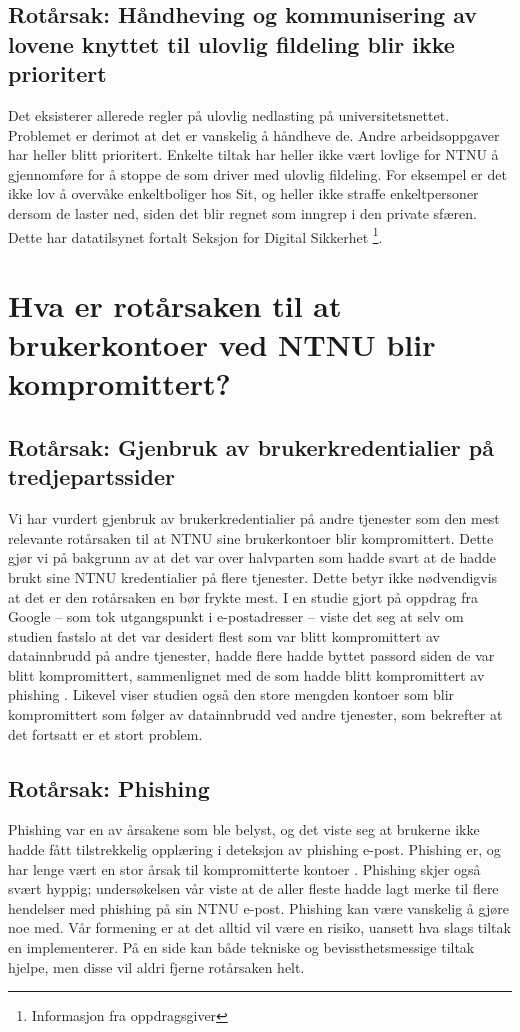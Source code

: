 \subsection*{Rotårsak: Håndheving og kommunisering av lovene knyttet til ulovlig fildeling blir ikke prioritert}
Det eksisterer allerede regler på ulovlig nedlasting på universitetsnettet. Problemet er derimot at det er vanskelig å håndheve de. Andre arbeidsoppgaver har heller blitt prioritert. Enkelte tiltak har heller ikke vært lovlige for NTNU å gjennomføre for å stoppe de som driver med ulovlig fildeling. For eksempel er det ikke lov å overvåke enkeltboliger hos Sit, og heller ikke straffe enkeltpersoner dersom de laster ned, siden det blir regnet som inngrep i den private sfæren. Dette har datatilsynet fortalt Seksjon for Digital Sikkerhet \footnote{Informasjon fra oppdragsgiver}. 


\section{Hva er rotårsaken til at brukerkontoer ved NTNU blir kompromittert?}

\subsection*{Rotårsak: Gjenbruk av brukerkredentialier på tredjepartssider}
Vi har vurdert gjenbruk av brukerkredentialier på andre tjenester som den mest relevante rotårsaken til at NTNU sine brukerkontoer blir kompromittert. Dette gjør vi på bakgrunn av at det var over halvparten som hadde svart at de hadde brukt sine NTNU kredentialier på flere tjenester. Dette betyr ikke nødvendigvis at det er den rotårsaken en bør frykte mest. I en studie gjort på oppdrag fra Google – som tok utgangspunkt i e-postadresser – viste det seg at selv om studien fastslo at det var desidert flest som var blitt kompromittert av datainnbrudd på andre tjenester, hadde flere hadde byttet passord siden de var blitt kompromittert, sammenlignet med de som hadde blitt kompromittert av phishing \cite{46437}. Likevel viser studien også den store mengden kontoer som blir kompromittert som følger av datainnbrudd ved andre tjenester, som bekrefter at det fortsatt er et stort problem. 

\subsection*{Rotårsak: Phishing}
Phishing var en av årsakene som ble belyst, og det viste seg at brukerne ikke hadde fått tilstrekkelig opplæring i deteksjon av phishing e-post. Phishing er, og har lenge vært en stor årsak til kompromitterte kontoer \cite{SophPhish}. Phishing skjer også svært hyppig; undersøkelsen vår viste at de aller fleste hadde lagt merke til flere hendelser med phishing på sin NTNU e-post. Phishing kan være vanskelig å gjøre noe med. Vår formening er at det alltid vil være en risiko, uansett hva slags tiltak en implementerer. På en side kan både tekniske og bevissthetsmessige tiltak hjelpe, men disse vil aldri fjerne rotårsaken helt. 

